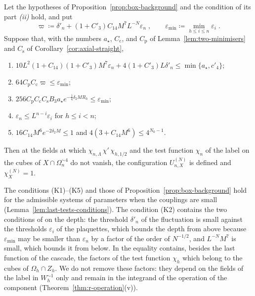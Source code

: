 \documentclass[11pt]{preprint}
\numberwithin{equation}{section}
\begin{document}
\begin{proposition}\label{prop:last-tests}
Let the hypotheses of Proposition~\ref{prop:box-background} and the condition of its part \emph{(ii)} hold, and put
\begin{equation}\label{eq:last-tests-quantities}
    \varpi \coloneqq \delta'_n + (1 + C'_3)C_{14}M^7L^{-N}\varepsilon_n\;,
    \qquad
    \varepsilon_{\min} \coloneqq \min_{h \leqslant i \leqslant n}\varepsilon_i\;.
\end{equation}
Suppose that, with the numbers $a_\star$, $C_{\mathrm c}$, and $C_{\mathrm p}$ of Lemma~\ref{lem:two-minimisers} and $C_{\mathrm s}$ of Corollary~\ref{cor:axial-straight},
\begin{enumerate}[label=(K\arabic*)]
\item $10L^2(1 + C_{14})(1 + C'_3)M^7\varepsilon_n + 4(1 + C'_3)L\delta'_n \leqslant \min\{ a_\star, c'_4 \}$;
\item $64C_{\mathrm p}C_{\mathrm c}\varpi \leqslant \varepsilon_{\min}$;
\item $256C_{\mathrm p}C_{\mathrm c}C_{\mathrm s}B_3a_\star e^{-\frac{1}{4}\delta_2MR_h} \leqslant \varepsilon_{\min}$;
\item $\varepsilon_n \leqslant L^{n-i}\varepsilon_i$ for $h \leqslant i < n$;
\item $16C_{14}M^6e^{-2\delta_2M} \leqslant 1$ and $4(3 + C_{14}M^6) \leqslant 4^{N_0-1}$.
\end{enumerate}
Then at the fields at which $\chi_{n,\Lambda}\,\chi'\,\chi_{h,1/2}$ and the test function $\chi_n$ of the label on the cubes of $X \cap \Omega^{\sim4}_n$ do not vanish, the configuration $U^{(N)}_{n,X}$ is defined and $\chi^{(N)}_X = 1$.
\end{proposition}

The conditions (K1)--(K5) and those of Proposition~\ref{prop:box-background} hold for the admissible systems of parameters when the couplings are small (Lemma~\ref{lem:last-tests-conditions}). The condition (K2) contains the two conditions of \cite[(1.94), p.~198]{BalabanLFR1} on the depth: the threshold $\delta'_n$ of the fluctuation is small against the thresholds $\varepsilon_i$ of the plaquettes, which bounds the depth from above because $\varepsilon_{\min}$ may be smaller than $\varepsilon_n$ by a factor of the order of $N^{-1/2}$, and $L^{-N}M^7$ is small, which bounds it from below. In \cite[(1.89)]{BalabanLFR1} the equality contains, besides the last function of the cascade, the factors of the test function $\chi_h$ which belong to the cubes of $\Omega_h \cap Z_h$. We do not remove these factors: they depend on the fields of the label in $W_h^{\sim1}$ only and remain in the integrand of the operation of the component (Theorem~\ref{thm:r-operation}(v)).
\end{document}
